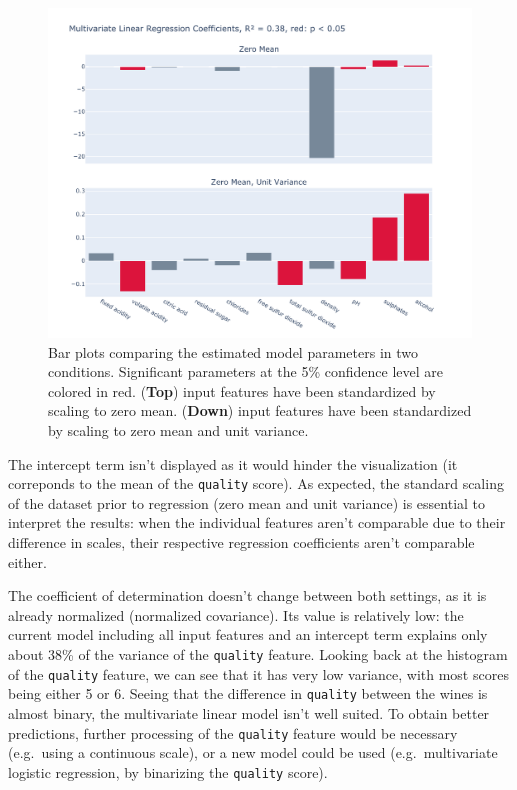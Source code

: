 \documentclass[12pt]{article}
\begin{document}
  \begin{figure}[!ht]
    \centering
    \includegraphics[width=\textwidth]{figures/mlr}
    \caption{Bar plots comparing the estimated model parameters in two
    conditions. Significant parameters at the 5\% confidence level are colored
    in red. (\textbf{Top}) input features have been standardized by scaling
    to zero mean. (\textbf{Down}) input features have been standardized by
    scaling to zero mean and unit variance.}%
    \label{fig:mlr}
  \end{figure} 

  The intercept term isn't displayed as it would hinder the visualization (it
  correponds to the mean of the \lstinline{quality} score). As expected, the
  standard scaling of the dataset prior to regression (zero mean and unit
  variance) is essential to interpret the results: when the individual features
  aren't comparable due to their difference in scales, their respective
  regression coefficients aren't comparable either.

  The coefficient of determination doesn't change between both settings, as it
  is already normalized (normalized covariance). Its value is relatively low:
  the current model including all input features and an intercept term explains
  only about 38\% of the variance of the \lstinline{quality} feature. Looking
  back at the histogram of the \lstinline{quality} feature, we can see that it
  has very low variance, with most scores being either 5 or 6. Seeing that the
  difference in \lstinline{quality} between the wines is almost binary, the
  multivariate linear model isn't well suited. To obtain better predictions,
  further processing of the \lstinline{quality} feature would be necessary
  (e.g.\ using a continuous scale), or a new model could be used (e.g.\
  multivariate logistic regression, by binarizing the \lstinline{quality}
  score).
\end{document}
